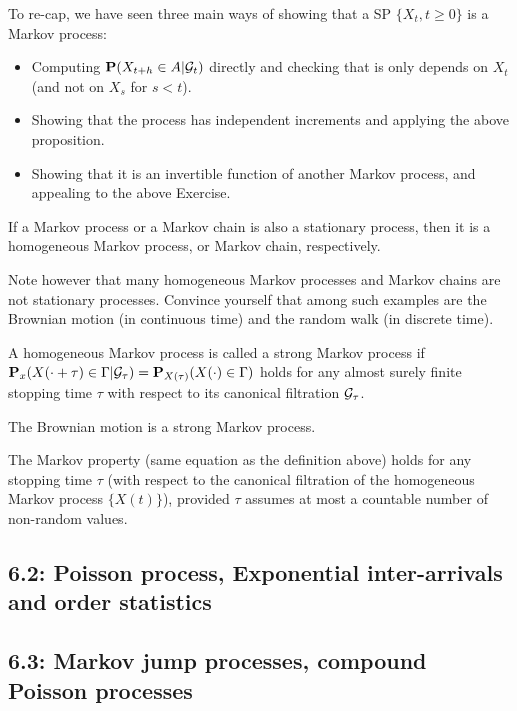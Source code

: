 \begin{remark*} 
To re-cap, we have seen three main ways of showing that a SP $\{X_t, t \ge
0\}$ is a Markov process:
\begin{itemize}
\item Computing $\mathbf{P}(X_{t+h} \in A | \mathcal{G}_t)$ directly and checking that is only
depends on $X_t$ (and not on $X_s$ for $s < t$).

\item Showing that the process has independent increments and applying
the above proposition.

\item Showing that it is an invertible function of another Markov process, and
appealing to the above Exercise.
\end{itemize}
\end{remark*} 

\begin{proposition*} 
If a Markov process or a Markov chain is also a stationary process, then it is a
homogeneous Markov process, or Markov chain, respectively.
\end{proposition*} 

\begin{remark*} 
Note however that many homogeneous Markov processes and Markov chains are not
stationary processes. Convince yourself that among such examples are the
Brownian motion (in continuous time) and the random walk (in discrete time).
\end{remark*} 

\begin{definition*} 
A homogeneous Markov process is called a strong Markov process if
$\mathbf{P}_x(X(\cdot + \tau) \in \Gamma | \mathcal{G}_\tau) = \mathbf{P}_{X(\tau)} (X(\cdot)
\in \Gamma)$ holds for any almost surely finite stopping time $\tau$ with
respect to its canonical filtration $\mathcal{G}_\tau$.
\end{definition*} 

\begin{corollary*} 
The Brownian motion is a strong Markov process.
\end{corollary*} 

\begin{proposition*} 
The Markov property (same equation as the definition above) holds for any
stopping time $\tau$ (with respect to the canonical filtration of the
homogeneous Markov process $\{X(t)\}$), provided $\tau$ assumes at most a
countable number of non-random values.
\end{proposition*} 







\subsection*{6.2: Poisson process, Exponential inter-arrivals and order statistics}
\subsection*{6.3: Markov jump processes, compound Poisson processes}